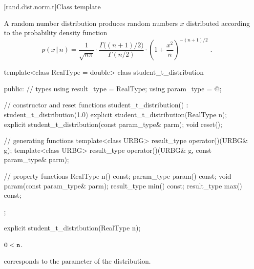 
[rand.dist.norm.t]{Class template }%
%
%

\pnum
A  random number distribution
produces random numbers $x$
distributed according to
the probability density function%
%
%
\[ p(x\,|\,n) = \frac{1}{\sqrt{n \pi}}
     \cdot \frac{\Gamma\big((n+1)/2\big)}{\Gamma(n/2)}
     \cdot \left(1 + \frac{x^2}{n} \right)^{-(n+1)/2}
     \text{ .} \]

%
%
\begin{codeblock}
template<class RealType = double>
  class student_t_distribution {
  public:
    // types
    using result_type = RealType;
    using param_type  = @\unspec@;

    // constructor and reset functions
    student_t_distribution() : student_t_distribution(1.0) {}
    explicit student_t_distribution(RealType n);
    explicit student_t_distribution(const param_type& parm);
    void reset();

    // generating functions
    template<class URBG>
      result_type operator()(URBG& g);
    template<class URBG>
      result_type operator()(URBG& g, const param_type& parm);

    // property functions
    RealType n() const;
    param_type param() const;
    void param(const param_type& parm);
    result_type min() const;
    result_type max() const;
  };
\end{codeblock}


%
\begin{itemdecl}
explicit student_t_distribution(RealType n);
\end{itemdecl}

\begin{itemdescr}
\pnum
\expects
$0 < \texttt{n}$.

\pnum
\remarks
{} corresponds to the parameter of the distribution.
\end{itemdescr}

